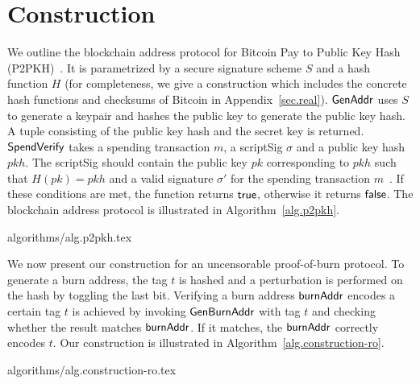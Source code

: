 \section{Construction}\label{sec:construction}

We outline the blockchain address protocol for Bitcoin Pay to Public Key Hash (P2PKH)~\cite{bitcoin-dev-guide}. It is parametrized by a secure signature scheme $S$ and a hash function $H$ (for completeness, we give a construction which includes the concrete hash
functions and checksums of Bitcoin in Appendix~\ref{sec.real}).
$\mathsf{GenAddr}$ uses $S$ to generate a keypair and hashes the public key to generate the public key hash. A tuple consisting of the public key hash and the secret key is returned.
$\mathsf{SpendVerify}$ takes a spending transaction $m$, a scriptSig $\sigma$ and a public key hash $pkh$. The scriptSig should contain the public key $pk$ corresponding to $pkh$ such that $H(pk) = pkh$ and a valid signature $\sigma'$ for the spending transaction $m$~\cite{bitcoin-dev-guide}. If these conditions are met, the function returns $\mathsf{true}$, otherwise it returns $\mathsf{false}$.
The blockchain address protocol is illustrated in Algorithm~\ref{alg.p2pkh}.

{algorithms/alg.p2pkh.tex}

We now present our construction for an uncensorable proof-of-burn protocol. To generate a burn address, the tag $t$ is hashed and a perturbation is performed on the hash by toggling the last bit.
Verifying a burn address $\mathsf{burnAddr}$ encodes a certain tag $t$ is achieved by invoking $\mathsf{Gen}\-\mathsf{Burn}\-\mathsf{Addr}$ with tag $t$ and checking whether the result matches $\mathsf{burnAddr}$. If it matches, the $\mathsf{burnAddr}$ correctly encodes $t$. Our construction is illustrated in Algorithm~\ref{alg.construction-ro}.

{algorithms/alg.construction-ro.tex}
